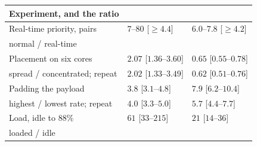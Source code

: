 \begin{tabular}{@{}p{}ll@{}}
\toprule
Experiment, and the ratio & \kafka{} & \redis{} \\
\midrule
Real-time priority, \rtPairsWord{} pairs & $7$--$80$ [$\geq 4.4$] & $6.0$--$7.8$ [$\geq 4.2$] \\
\quad normal / real-time & & \\
Placement on six cores & $2.07$ [$1.36$--$3.60$] & $0.65$ [$0.55$--$0.78$] \\
\quad spread / concentrated; repeat & $2.02$ [$1.33$--$3.49$] & $0.62$ [$0.51$--$0.76$] \\
Padding the payload & $3.8$ [$3.1$--$4.8$] & $7.9$ [$6.2$--$10.4$] \\
\quad highest / lowest rate; repeat & $4.0$ [$3.3$--$5.0$] & $5.7$ [$4.4$--$7.7$] \\
Load, idle to $88\%$ & $61$ [$33$--$215$] & $21$ [$14$--$36$] \\
\quad loaded / idle & & \\
\bottomrule
\end{tabular}
